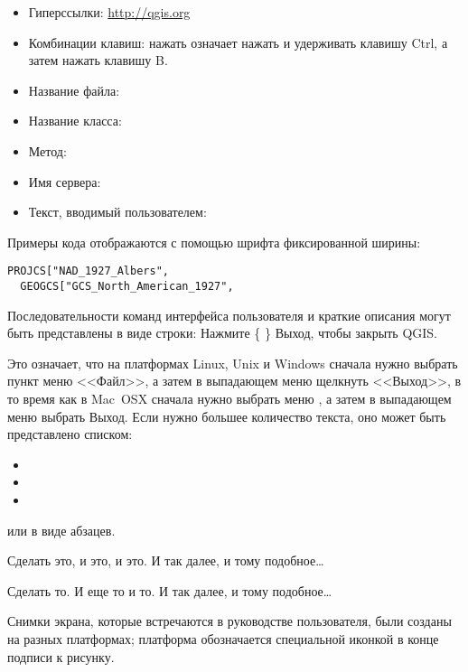 \begin{itemize}[label=--]
\item Гиперссылки: \url{http://qgis.org}
\item Комбинации клавиш: нажать  означает
нажать и удерживать клавишу Ctrl, а затем нажать клавишу B.
\item Название файла: 
\item Название класса: 
\item Метод: 
\item Имя сервера: 
\item Текст, вводимый пользователем: 
\end{itemize}

Примеры кода отображаются с помощью шрифта фиксированной ширины:
\begin{verbatim}
PROJCS["NAD_1927_Albers",
  GEOGCS["GCS_North_American_1927",
\end{verbatim}


Последовательности команд интерфейса пользователя и краткие описания
 могут быть представлены в виде строки: Нажмите \{\nix{}
\} \arrow Выход, чтобы закрыть QGIS.

Это означает, что на платформах Linux, Unix и Windows сначала нужно
выбрать пункт меню <<Файл>>, а затем в выпадающем меню щелкнуть <<Выход>>,
в то время как в Mac~OSX сначала нужно выбрать меню \qg,
а затем в выпадающем меню выбрать Выход. Если нужно большее количество
текста, оно может быть представлено списком:

\begin{itemize}
\item {}
\item {}
\item {}
\end{itemize}

или в виде абзацев.

\nix{} \osx{} Сделать это, и это, и это. И так далее, и тому подобное\dots

\win{}Сделать то. И еще то и то. И так далее, и тому подобное\dots

Снимки экрана, которые встречаются в руководстве пользователя, были
созданы на разных платформах; платформа обозначается специальной иконкой
в конце подписи к рисунку.

